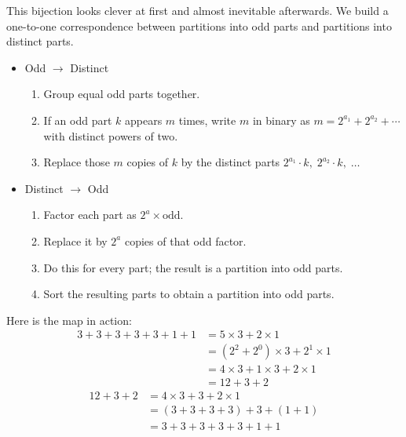
This bijection looks clever at first and almost inevitable afterwards. We build a one-to-one correspondence between partitions into odd parts and partitions into distinct parts.
\begin{itemize}
    \item Odd $\rightarrow$ Distinct
        \begin{enumerate}
            \item Group equal odd parts together.
            \item If an odd part $k$ appears $m$ times, write $m$ in binary as
                    $m = 2^{a_{1}} + 2^{a_{2}} + \cdots$ with distinct powers of two.
            \item Replace those $m$ copies of $k$ by the distinct parts $2^{a_{1}} \cdot k,\;
                    2^{a_{2}} \cdot k,\; \dots$
        \end{enumerate}
    \item Distinct $\rightarrow$ Odd
        \begin{enumerate}
            \item Factor each part as $2^{a}\times \text{odd}$.
            \item Replace it by $2^{a}$ copies of that odd factor.
            \item Do this for every part; the result is a partition into odd parts.
            \item Sort the resulting parts to obtain a partition into odd parts.
        \end{enumerate}
\end{itemize}
Here is the map in action:
\begin{equation*}
    \begin{aligned}
        3 + 3 + 3 + 3 + 3 + 1 + 1
        &= 5\times 3 + 2\times 1 \\
        &= (2^{2} + 2^{0})\times 3 + 2^{1}\times 1 \\
        &= 4\times 3 + 1\times 3 + 2\times 1 \\
        &= 12 + 3 + 2
    \end{aligned}
\end{equation*}
\begin{equation*}
    \begin{aligned}
        12 + 3 + 2
        &= 4\times 3 + 3 + 2\times 1 \\
        &= (3 + 3 + 3 + 3) + 3 + (1 + 1) \\
        &= 3 + 3 + 3 + 3 + 3 + 1 + 1
    \end{aligned}
\end{equation*}

